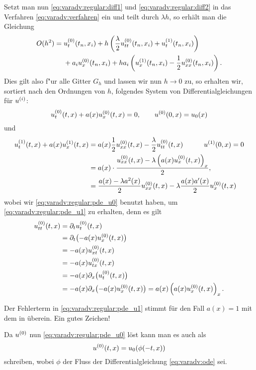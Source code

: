 Setzt man nun \eqref{eq:varadv:regular:diff1} und \eqref{eq:varadv:regular:diff2} in das Verfahren \eqref{eq:varadv:verfahren} ein und teilt durch $\lambda h$, so erhält man die Gleichung
\begin{align*}
\begin{split}
O(h^2) ={}& u^{(0)}_t (t_n, x_i) + h \left( \frac \lambda 2 u^{(0)}_{tt}(t_n, x_i) + u^{(1)}_t(t_n, x_i) \right)\\
          & + a_i u^{(0)}_x(t_n, x_i) + h a_i \left( u^{(1)}_x(t_n, x_i) - \frac 12 u^{(0)}_{xx}(t_n, x_i) \right).
\end{split}\end{align*}
Dies gilt also f"ur alle Gitter $G_h$ und lassen wir nun $h \to 0$ zu, so erhalten wir, sortiert nach den Ordnungen von $h$, folgendes System von Differentialgleichungen für $u^{(i)}$:
\begin{equation}\label{eq:varadv:regular:pde_u0}
u^{(0)}_t(t, x) + a(x) u^{(0)}_x(t,x) = 0, \qquad u^{(0)}(0, x) = u_0(x)
\end{equation}
und
\begin{align}\label{eq:varadv:regular:pde_u1}
u^{(1)}_t(t, x) + a(x) u^{(1)}_x(t, x) &= a(x) \frac 12 u^{(0)}_{xx}(t, x) - \frac \lambda 2 u^{(0)}_{tt}(t, x) \qquad \quad u^{(1)}(0, x) = 0\notag\\
&= a(x) \cdot \frac{u^{(0)}_{xx}(t,x) - \lambda \left( a(x) u^{(0)}_x(t,x) \right)_x}{2},\\
\label{eq:varadv:regular:pde_u1_richtig}
&=  \frac {a(x) - \lambda a^2(x)}{2} u^{(0)}_{xx}(t,x) - \lambda \frac{a(x) a'(x)}{2} u^{(0)}_x(t,x)
\end{align}
wobei wir \eqref{eq:varadv:regular:pde_u0} benutzt haben, um \eqref{eq:varadv:regular:pde_u1} zu erhalten, denn es gilt
\begin{align*}
u^{(0)}_{tt}(t,x) &= \partial_t u^{(0)}_t(t,x)\\
              &= \partial_t \bigl( - a(x) u^{(0)}_x(t,x) \bigr)\\
              &= - a(x) u^{(0)}_{xt}(t,x)\\
              &= -a(x) u^{(0)}_{tx}(t,x)\\
              &= - a(x) \partial_x \bigl( u^{(0)}_t(t,x) \bigr)\\
              &= - a(x) \partial_x \bigl( - a(x) u^{(0)}_x(t,x) \bigr) = a(x) \left( a(x) u^{(0)}_x(t,x) \right)_x.
\end{align*}
\begin{bemerkung}
Der Fehlerterm in \eqref{eq:varadv:regular:pde_u1} stimmt für den Fall $a(x) = 1$ mit dem in \cite{Junk2004} überein.
Ein gutes Zeichen!
\end{bemerkung}
Da $u^{(0)}$ nun \eqref{eq:varadv:regular:pde_u0} löst kann man es auch als
\[ u^{(0)}(t,x) = u_0(\phi(-t,x)) \]
schreiben, wobei $\phi$ der Fluss der Differentialgleichung \eqref{eq:varadv:ode} sei.

